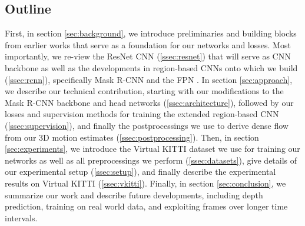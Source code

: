 \subsection{Outline}
First, in section \ref{sec:background}, we introduce preliminaries and building
blocks from earlier works that serve as a foundation for our networks and losses.
Most importantly, we re-view the ResNet CNN (\ref{ssec:resnet}) that will serve as CNN backbone
as well as the developments in region-based CNNs onto which we build (\ref{ssec:rcnn}),
specifically Mask R-CNN and the FPN \cite{FPN}.
In section \ref{sec:approach}, we describe our technical contribution, starting
with our modifications to the Mask R-CNN backbone and head networks (\ref{ssec:architecture}),
followed by our losses and supervision methods for training
the extended region-based CNN (\ref{ssec:supervision}), and
finally the postprocessings we use to derive dense flow from our 3D motion estimates
(\ref{ssec:postprocessing}).
Then, in section \ref{sec:experiments}, we introduce the Virtual KITTI dataset we use
for training our networks as well as all preprocessings we perform (\ref{ssec:datasets}),
give details of our experimental setup (\ref{ssec:setup}),
and finally describe the experimental results
on Virtual KITTI (\ref{ssec:vkitti}).
Finally, in section \ref{sec:conclusion}, we summarize our work and describe future
developments, including depth prediction, training on real world data,
and exploiting frames over longer time intervals.
